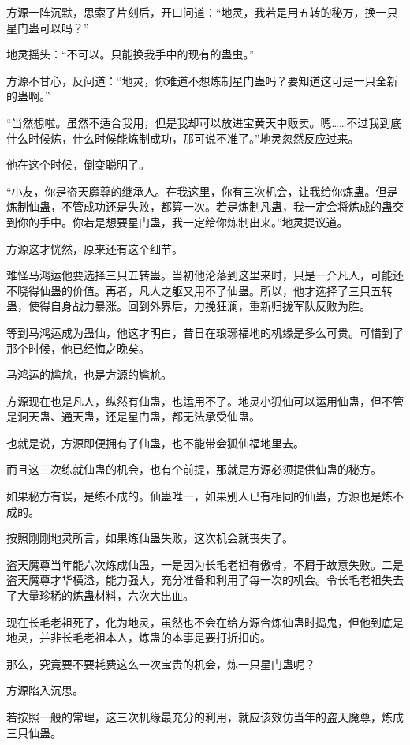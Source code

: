\begin{this_body}
方源一阵沉默，思索了片刻后，开口问道：“地灵，我若是用五转的秘方，换一只星门蛊可以吗？”

地灵摇头：“不可以。只能换我手中的现有的蛊虫。”

方源不甘心，反问道：“地灵，你难道不想炼制星门蛊吗？要知道这可是一只全新的蛊啊。”

“当然想啦。虽然不适合我用，但是我却可以放进宝黄天中贩卖。嗯……不过我到底什么时候炼，什么时候能炼制成功，那可说不准了。”地灵忽然反应过来。

他在这个时候，倒变聪明了。

“小友，你是盗天魔尊的继承人。在我这里，你有三次机会，让我给你炼蛊。但是炼制仙蛊，不管成功还是失败，都算一次。若是炼制凡蛊，我一定会将炼成的蛊交到你的手中。你若是想要星门蛊，我一定给你炼制出来。”地灵提议道。

方源这才恍然，原来还有这个细节。

难怪马鸿运他要选择三只五转蛊。当初他沦落到这里来时，只是一介凡人，可能还不晓得仙蛊的价值。再者，凡人之躯又用不了仙蛊。所以，他才选择了三只五转蛊，使得自身战力暴涨。回到外界后，力挽狂澜，重新归拢军队反败为胜。

等到马鸿运成为蛊仙，他这才明白，昔日在琅琊福地的机缘是多么可贵。可惜到了那个时候，他已经悔之晚矣。

马鸿运的尴尬，也是方源的尴尬。

方源现在也是凡人，纵然有仙蛊，也运用不了。地灵小狐仙可以运用仙蛊，但不管是洞天蛊、通天蛊，还是星门蛊，都无法承受仙蛊。

也就是说，方源即便拥有了仙蛊，也不能带会狐仙福地里去。

而且这三次练就仙蛊的机会，也有个前提，那就是方源必须提供仙蛊的秘方。

如果秘方有误，是练不成的。仙蛊唯一，如果别人已有相同的仙蛊，方源也是炼不成的。

按照刚刚地灵所言，如果炼仙蛊失败，这次机会就丧失了。

盗天魔尊当年能六次炼成仙蛊，一是因为长毛老祖有傲骨，不屑于故意失败。二是盗天魔尊才华横溢，能力强大，充分准备和利用了每一次的机会。令长毛老祖失去了大量珍稀的炼蛊材料，六次大出血。

现在长毛老祖死了，化为地灵，虽然也不会在给方源合炼仙蛊时捣鬼，但他到底是地灵，并非长毛老祖本人，炼蛊的本事是要打折扣的。

那么，究竟要不要耗费这么一次宝贵的机会，炼一只星门蛊呢？

方源陷入沉思。

若按照一般的常理，这三次机缘最充分的利用，就应该效仿当年的盗天魔尊，炼成三只仙蛊。


\end{this_body}
